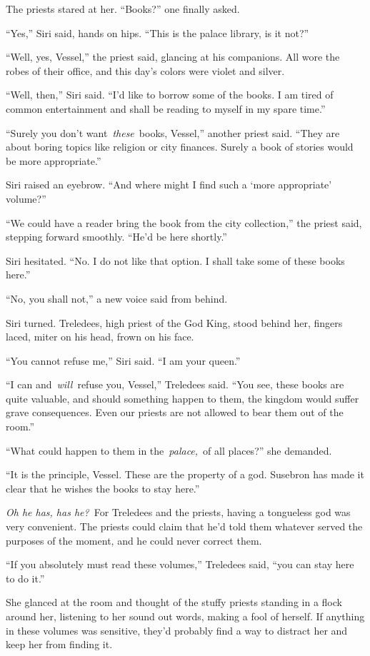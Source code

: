 The priests stared at her. “Books?” one finally asked.

“Yes,” Siri said, hands on hips. “This is the palace library, is it not?”

“Well, yes, Vessel,” the priest said, glancing at his companions. All wore the robes of their office, and this day’s colors were violet and silver.

“Well, then,” Siri said. “I’d like to borrow some of the books. I am tired of common entertainment and shall be reading to myself in my spare time.”

“Surely you don’t want~\textit{these}~books, Vessel,” another priest said. “They are about boring topics like religion or city finances. Surely a book of stories would be more appropriate.”

Siri raised an eyebrow. “And where might I find such a ‘more appropriate’ volume?”

“We could have a reader bring the book from the city collection,” the priest said, stepping forward smoothly. “He’d be here shortly.”

Siri hesitated. “No. I do not like that option. I shall take some of these books here.”

“No, you shall not,” a new voice said from behind.

Siri turned. Treledees, high priest of the God King, stood behind her, fingers laced, miter on his head, frown on his face.

“You cannot refuse me,” Siri said. “I am your queen.”

“I can and~\textit{will}~refuse you, Vessel,” Treledees said. “You see, these books are quite valuable, and should something happen to them, the kingdom would suffer grave consequences. Even our priests are not allowed to bear them out of the room.”

“What could happen to them in the~\textit{palace,}~of all places?” she demanded.

“It is the principle, Vessel. These are the property of a god. Susebron has made it clear that he wishes the books to stay here.”

\textit{Oh he has, has he?}~For Treledees and the priests, having a tongueless god was very convenient. The priests could claim that he’d told them whatever served the purposes of the moment, and he could never correct them.

“If you absolutely must read these volumes,” Treledees said, “you can stay here to do it.”

She glanced at the room and thought of the stuffy priests standing in a flock around her, listening to her sound out words, making a fool of herself. If anything in these volumes was sensitive, they’d probably find a way to distract her and keep her from finding it.

